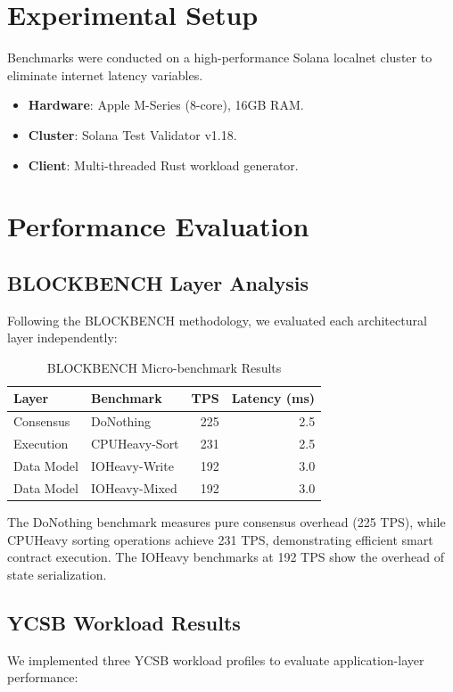 \documentclass[conference]{IEEEtran}
\begin{document}
\section{Experimental Setup}
Benchmarks were conducted on a high-performance Solana localnet cluster to eliminate internet latency variables.
\begin{itemize}
    \item \textbf{Hardware}: Apple M-Series (8-core), 16GB RAM.
    \item \textbf{Cluster}: Solana Test Validator v1.18.
    \item \textbf{Client}: Multi-threaded Rust workload generator.
\end{itemize}

\section{Performance Evaluation}

\subsection{BLOCKBENCH Layer Analysis}
Following the BLOCKBENCH methodology, we evaluated each architectural layer independently:

\begin{table}[htbp]
\caption{BLOCKBENCH Micro-benchmark Results}
\begin{center}
\begin{tabular}{llrr}
\toprule
\textbf{Layer} & \textbf{Benchmark} & \textbf{TPS} & \textbf{Latency (ms)} \\
\midrule
Consensus & DoNothing & 225 & 2.5 \\
Execution & CPUHeavy-Sort & 231 & 2.5 \\
Data Model & IOHeavy-Write & 192 & 3.0 \\
Data Model & IOHeavy-Mixed & 192 & 3.0 \\
\bottomrule
\end{tabular}
\label{tab:blockbench}
\end{center}
\end{table}

The DoNothing benchmark measures pure consensus overhead (225 TPS), while CPUHeavy sorting operations achieve 231 TPS, demonstrating efficient smart contract execution. The IOHeavy benchmarks at 192 TPS show the overhead of state serialization.

\subsection{YCSB Workload Results}
We implemented three YCSB workload profiles to evaluate application-layer performance:
\end{document}
